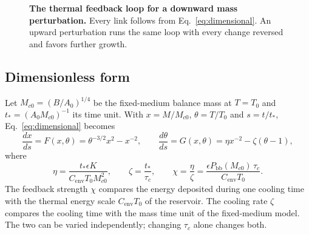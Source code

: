 \documentclass[11pt,a4paper]{article}
\newcommand{\Pbb}{P_{\mathrm{bb}}}
\newcommand{\Mc}{M_{c0}}
\newcommand{\tstar}{t_*}
\newcommand{\Cenv}{C_{\mathrm{env}}}
\begin{document}
\begin{figure}[tbp]
\centering
{}
\caption{\textbf{The thermal feedback loop for a downward mass perturbation.} Every link follows from Eq.~\eqref{eq:dimensional}. An upward perturbation runs the same loop with every change reversed and favors further growth.}
\label{fig:loop}
\end{figure}

\subsection{Dimensionless form}
Let $\Mc=(B/A_0)^{1/4}$ be the fixed-medium balance mass at $T=T_0$ and $\tstar=(A_0\Mc)^{-1}$ its time unit. With $x=M/\Mc$, $\theta=T/T_0$ and $s=t/\tstar$, Eq.~\eqref{eq:dimensional} becomes
\begin{equation}
 \frac{dx}{ds}=F(x,\theta)=\theta^{-3/2}x^2-x^{-2},\qquad
 \frac{d\theta}{ds}=G(x,\theta)=\eta x^{-2}-\zeta(\theta-1),
 \label{eq:system}
\end{equation}
where
\begin{equation}
 \eta=\frac{\tstar\epsilon K}{\Cenv T_0\Mc^2},\qquad
 \zeta=\frac{\tstar}{\tau_c},\qquad
 \chi=\frac{\eta}{\zeta}=\frac{\epsilon\Pbb(\Mc)\,\tau_c}{\Cenv T_0}.
 \label{eq:params}
\end{equation}
The feedback strength $\chi$ compares the energy deposited during one cooling time with the thermal energy scale $\Cenv T_0$ of the reservoir. The cooling rate $\zeta$ compares the cooling time with the mass time unit of the fixed-medium model. The two can be varied independently; changing $\tau_c$ alone changes both.
\end{document}
